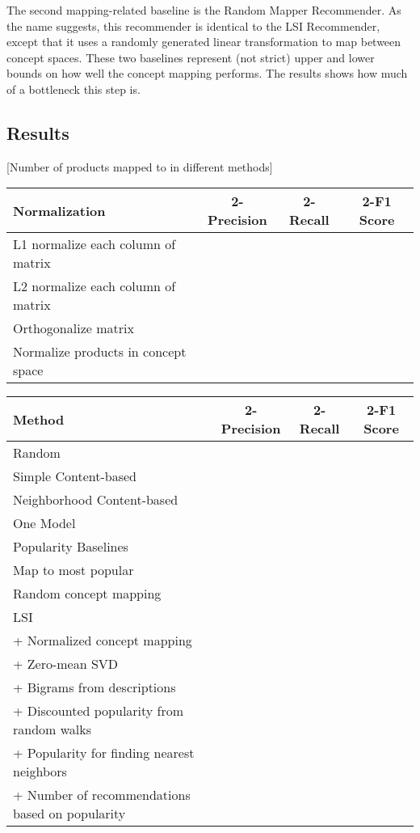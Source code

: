 \documentclass[11pt]{article}
\begin{document}
The second mapping-related baseline is the Random Mapper Recommender. As the
name suggests, this recommender is identical to the LSI Recommender, except that
it uses a randomly generated linear transformation to map between concept
spaces. These two baselines represent (not strict) upper and lower bounds on how
well the concept mapping performs. The results shows how much of a bottleneck
this step is.

\subsection*{Results}
[Number of products mapped to in different methods]
\begin{center}
\begin{tabular}{ | l | c | c | c |}
\hline
Normalization & 2-Precision & 2-Recall & 2-F1 Score \\ \hline\hline
L1 normalize each column of matrix &&&\\ \hline
L2 normalize each column of matrix &&&\\ \hline
Orthogonalize matrix &&&\\ \hline
Normalize products in concept space &&&\\ \hline
\end{tabular}
\end{center}

\begin{center}
\begin{tabular}{ | l | c | c | c |}
\hline
Method & 2-Precision & 2-Recall & 2-F1 Score \\ \hline\hline
Random &&&\\ \hline
Simple Content-based &&&\\ \hline
Neighborhood Content-based &&&\\ \hline
One Model &&&\\ \hline
Popularity Baselines &&&\\ \hline
\hspace*{0.5cm} Map to most popular &&&\\ \hline
\hspace*{0.5cm} Random concept mapping &&&\\ \hline
LSI &&&\\ \hline
\hspace*{0.5cm} + Normalized concept mapping &&&\\ \hline
\hspace*{0.5cm} + Zero-mean SVD &&&\\ \hline
\hspace*{0.5cm} + Bigrams from descriptions &&&\\ \hline
\hspace*{0.5cm} + Discounted popularity from random walks &&&\\ \hline
\hspace*{0.5cm} + Popularity for finding nearest neighbors &&&\\ \hline
\hspace*{0.5cm} + Number of recommendations based on popularity &&&\\ \hline

\end{tabular}
\end{center}
\end{document}
